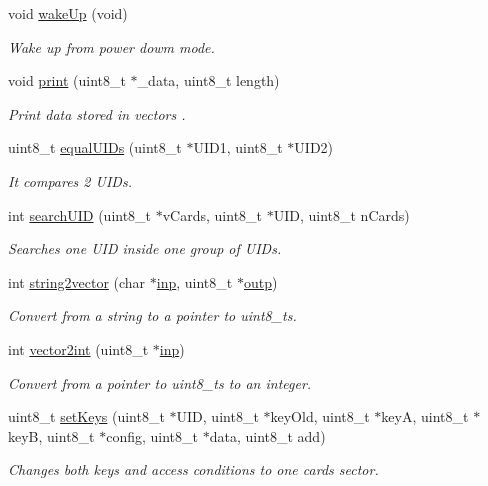 \begin{DoxyCompactItemize}
void \hyperlink{class_wasp_r_f_i_d_a0414fab871837149b0b36b914511c8d1}{wake\+Up} (void)
\begin{DoxyCompactList}\small\item\em Wake up from power dowm mode. \end{DoxyCompactList}\item 
void \hyperlink{class_wasp_r_f_i_d_afb4ede4f2bf41084ddaa4e12f82e4b22}{print} (uint8\+\_\+t $\ast$\+\_\+data, uint8\+\_\+t length)
\begin{DoxyCompactList}\small\item\em Print data stored in vectors . \end{DoxyCompactList}\item 
uint8\+\_\+t \hyperlink{class_wasp_r_f_i_d_a7760772c0b1d31ca34079445d47843ac}{equal\+U\+I\+Ds} (uint8\+\_\+t $\ast$U\+I\+D1, uint8\+\_\+t $\ast$U\+I\+D2)
\begin{DoxyCompactList}\small\item\em It compares 2 U\+I\+Ds. \end{DoxyCompactList}\item 
int \hyperlink{class_wasp_r_f_i_d_a0730c22e241bda1be982310858b3888d}{search\+U\+ID} (uint8\+\_\+t $\ast$v\+Cards, uint8\+\_\+t $\ast$U\+ID, uint8\+\_\+t n\+Cards)
\begin{DoxyCompactList}\small\item\em Searches one U\+ID inside one group of U\+I\+Ds. \end{DoxyCompactList}\item 
int \hyperlink{class_wasp_r_f_i_d_a25720ecdc923695042eb276ec624c903}{string2vector} (char $\ast$\hyperlink{group__deprecated__items_ga5cfa4750a0633c34c7a361d8fd62c042}{inp}, uint8\+\_\+t $\ast$\hyperlink{group__deprecated__items_gaab324bd721e821e275f00c3478e240c9}{outp})
\begin{DoxyCompactList}\small\item\em Convert from a string to a pointer to uint8\+\_\+t\textquotesingle{}s. \end{DoxyCompactList}\item 
int \hyperlink{class_wasp_r_f_i_d_a5f1c6e5544e13b461139e7a87ed115f8}{vector2int} (uint8\+\_\+t $\ast$\hyperlink{group__deprecated__items_ga5cfa4750a0633c34c7a361d8fd62c042}{inp})
\begin{DoxyCompactList}\small\item\em Convert from a pointer to uint8\+\_\+t\textquotesingle{}s to an integer. \end{DoxyCompactList}\item 
uint8\+\_\+t \hyperlink{class_wasp_r_f_i_d_ac24621d20510f74d8d4482d7e683624f}{set\+Keys} (uint8\+\_\+t $\ast$U\+ID, uint8\+\_\+t $\ast$key\+Old, uint8\+\_\+t $\ast$keyA, uint8\+\_\+t $\ast$keyB, uint8\+\_\+t $\ast$config, uint8\+\_\+t $\ast$data, uint8\+\_\+t add)
\begin{DoxyCompactList}\small\item\em Changes both keys and access conditions to one card\textquotesingle{}s sector. \end{DoxyCompactList}\end{DoxyCompactItemize}



